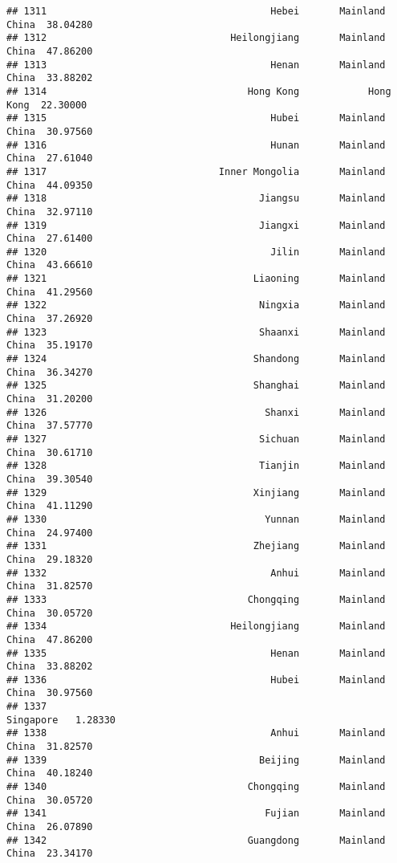 \documentclass[
]{article}
\begin{document}
\begin{verbatim}
## 1311                                       Hebei       Mainland China  38.04280
## 1312                                Heilongjiang       Mainland China  47.86200
## 1313                                       Henan       Mainland China  33.88202
## 1314                                   Hong Kong            Hong Kong  22.30000
## 1315                                       Hubei       Mainland China  30.97560
## 1316                                       Hunan       Mainland China  27.61040
## 1317                              Inner Mongolia       Mainland China  44.09350
## 1318                                     Jiangsu       Mainland China  32.97110
## 1319                                     Jiangxi       Mainland China  27.61400
## 1320                                       Jilin       Mainland China  43.66610
## 1321                                    Liaoning       Mainland China  41.29560
## 1322                                     Ningxia       Mainland China  37.26920
## 1323                                     Shaanxi       Mainland China  35.19170
## 1324                                    Shandong       Mainland China  36.34270
## 1325                                    Shanghai       Mainland China  31.20200
## 1326                                      Shanxi       Mainland China  37.57770
## 1327                                     Sichuan       Mainland China  30.61710
## 1328                                     Tianjin       Mainland China  39.30540
## 1329                                    Xinjiang       Mainland China  41.11290
## 1330                                      Yunnan       Mainland China  24.97400
## 1331                                    Zhejiang       Mainland China  29.18320
## 1332                                       Anhui       Mainland China  31.82570
## 1333                                   Chongqing       Mainland China  30.05720
## 1334                                Heilongjiang       Mainland China  47.86200
## 1335                                       Henan       Mainland China  33.88202
## 1336                                       Hubei       Mainland China  30.97560
## 1337                                                        Singapore   1.28330
## 1338                                       Anhui       Mainland China  31.82570
## 1339                                     Beijing       Mainland China  40.18240
## 1340                                   Chongqing       Mainland China  30.05720
## 1341                                      Fujian       Mainland China  26.07890
## 1342                                   Guangdong       Mainland China  23.34170

\end{verbatim}
\end{document}
